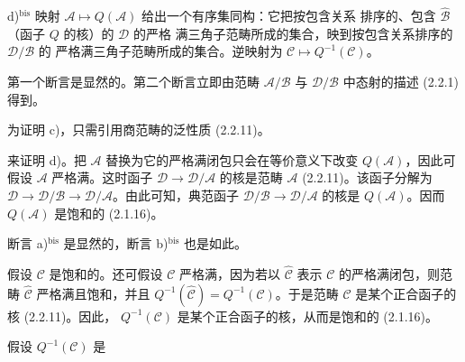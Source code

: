 \par\noindent d)$^{\mathrm{bis}}$ 映射
$\mathcal A\longmapsto Q(\mathcal A)$ 给出一个有序集同构：它把按包含关系
排序的、包含 $\widehat{\mathcal B}$（函子 $Q$ 的核）的 $\mathcal D$ 的严格
满三角子范畴所成的集合，映到按包含关系排序的 $\mathcal D/\mathcal B$ 的
严格满三角子范畴所成的集合。逆映射为
$\mathcal C\longmapsto Q^{-1}(\mathcal C)$。
\endgroup

第一个断言是显然的。第二个断言立即由范畴
$\mathcal A/\mathcal B$ 与 $\mathcal D/\mathcal B$ 中态射的描述 (2.2.1)
得到。

为证明 c)，只需引用商范畴的泛性质 (2.2.11)。

来证明 d)。把 $\mathcal A$ 替换为它的严格满闭包只会在等价意义下改变
$Q(\mathcal A)$，因此可假设 $\mathcal A$ 严格满。这时函子
$\mathcal D\longrightarrow\mathcal D/\mathcal A$ 的核是范畴 $\mathcal A$
(2.2.11)。该函子分解为
$\mathcal D\longrightarrow\mathcal D/\mathcal B
\longrightarrow\mathcal D/\mathcal A$。由此可知，典范函子
$\mathcal D/\mathcal B\longrightarrow\mathcal D/\mathcal A$ 的核是
$Q(\mathcal A)$。因而 $Q(\mathcal A)$ 是饱和的 (2.1.16)。

断言 a)$^{\mathrm{bis}}$ 是显然的，断言 b)$^{\mathrm{bis}}$ 也是如此。

假设 $\mathcal C$ 是饱和的。还可假设 $\mathcal C$ 严格满，因为若以
$\widehat{\mathcal C}$ 表示 $\mathcal C$ 的严格满闭包，则范畴
$\widehat{\mathcal C}$ 严格满且饱和，并且
$Q^{-1}(\widehat{\mathcal C})=Q^{-1}(\mathcal C)$。于是范畴
$\mathcal C$ 是某个正合函子的核 (2.2.11)。因此，
$Q^{-1}(\mathcal C)$ 是某个正合函子的核，从而是饱和的 (2.1.16)。

假设 $Q^{-1}(\mathcal C)$ 是
\endgroup
